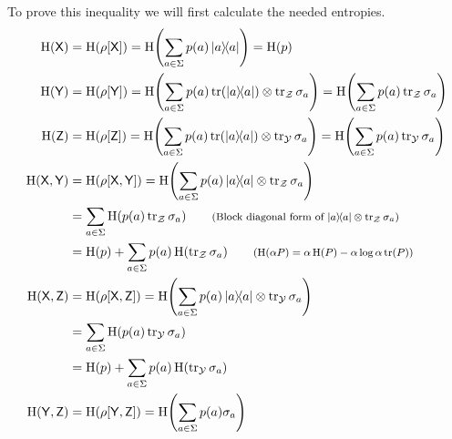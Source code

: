 \documentclass[boxes,pages,color=SeaGreen]{homework}
\newcommand{\Y}{\mathcal{Y}}
\newcommand{\Z}{\mathcal{Z}}
\newcommand{\reg}[1]{\mathsf{#1}}
\newcommand{\ent}{\operatorname{H}}
\newcommand{\smalltag}[1]{\tag*{\footnotesize (#1)}}
\begin{document}
\begin{solution}
    To prove this inequality we will first calculate the needed entropies.
    \begin{align*}
        \ent(\reg{X})          & = \ent(\rho[\reg{X}]) = \ent\!\qty(\sum_{a \in \Sigma} p(a)\ketbra{a}) = \ent(p)                                                                         \\
        \ent(\reg{Y})          & = \ent(\rho[\reg{Y}]) = \ent\!\qty(\sum_{a \in \Sigma} p(a)\tr(\ketbra{a})\otimes \tr_\Z\sigma_a) = \ent\!\qty(\sum_{a \in \Sigma} p(a) \tr_\Z \sigma_a) \\
        \ent(\reg{Z})          & = \ent(\rho[\reg{Z}]) = \ent\!\qty(\sum_{a \in \Sigma} p(a)\tr(\ketbra{a})\otimes \tr_\Y\sigma_a) = \ent\!\qty(\sum_{a \in \Sigma} p(a) \tr_\Y \sigma_a) \\
        \ent(\reg{X}, \reg{Y}) & = \ent(\rho[\reg{X}, \reg{Y}]) = \ent\!\qty(\sum_{a \in \Sigma} p(a) \ketbra{a}\otimes \tr_\Z\sigma_a)                                                   \\
                               & = \sum_{a \in \Sigma}\ent(p(a) \tr_\Z\sigma_a)           \smalltag{Block diagonal form of $\ketbra{a}\otimes\tr_\Z\sigma_a$}                             \\
                               & = \ent(p) + \sum_{a \in \Sigma} p(a)\ent(\tr_\Z\sigma_a) \smalltag{$\ent(\alpha P) = \alpha \ent(P) - \alpha \log\alpha \tr(P)$}                         \\
        \ent(\reg{X}, \reg{Z}) & = \ent(\rho[\reg{X}, \reg{Z}]) = \ent\!\qty(\sum_{a \in \Sigma} p(a) \ketbra{a}\otimes \tr_\Y\sigma_a)                                                   \\
                               & = \sum_{a \in \Sigma}\ent(p(a) \tr_\Y\sigma_a)                                                                                                           \\
                               & = \ent(p) + \sum_{a \in \Sigma} p(a)\ent(\tr_\Y\sigma_a)                                                                                                 \\
        \ent(\reg{Y}, \reg{Z}) & = \ent(\rho[\reg{Y}, \reg{Z}]) = \ent\!\qty(\sum_{a \in \Sigma} p(a) \sigma_a)
    \end{align*}

\end{solution}
\end{document}
